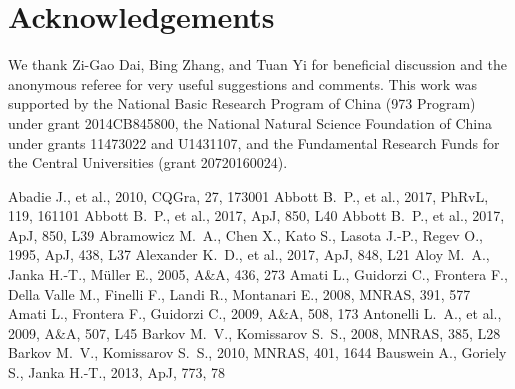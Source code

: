 \documentclass[a4paper,fleqn,usenatbib]{mnras}
\begin{document}
\section*{Acknowledgements}

We thank Zi-Gao Dai, Bing Zhang, and Tuan Yi for beneficial discussion and the anonymous referee for very useful suggestions and comments. This work was supported by the National Basic Research Program of China (973 Program) under grant 2014CB845800, the National Natural Science Foundation of China under grants 11473022 and U1431107, and the Fundamental Research Funds for the Central Universities (grant 20720160024).

\begin{thebibliography}{207}

 Abadie J., et al., 2010, CQGra, 27, 173001
 Abbott B.~P., et al., 2017, PhRvL, 119, 161101
 Abbott B.~P., et al., 2017, ApJ, 850, L40
 Abbott B.~P., et al., 2017, ApJ, 850, L39
 Abramowicz M.~A., Chen X., Kato S., Lasota J.-P., Regev O., 1995, ApJ, 438, L37
 Alexander K.~D., et al., 2017, ApJ, 848, L21
 Aloy M.~A., Janka H.-T., M{\"u}ller E., 2005, A\&A, 436, 273
 Amati L., Guidorzi C., Frontera F., Della Valle M., Finelli F., Landi R., Montanari E., 2008, MNRAS, 391, 577
 Amati L., Frontera F., Guidorzi C., 2009, A\&A, 508, 173
 Antonelli L.~A., et al., 2009, A\&A, 507, L45
 Barkov M.~V., Komissarov S.~S., 2008, MNRAS, 385, L28
 Barkov M.~V., Komissarov S.~S., 2010, MNRAS, 401, 1644
 Bauswein A., Goriely S., Janka H.-T., 2013, ApJ, 773, 78

\end{thebibliography}
\end{document}
